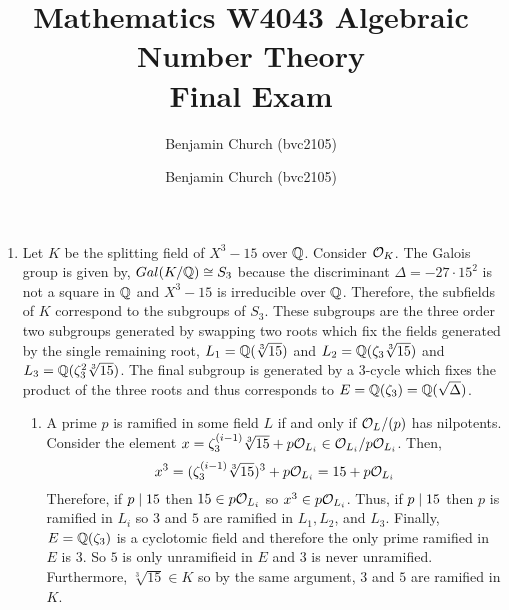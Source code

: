 \documentclass[12pt]{extarticle}
\author{Benjamin Church (bvc2105)}
\newcommand{\ntitle}[1]{\title{%
	\large \textbf{Mathematics W4043 Algebraic Number Theory
	\\ Final Exam} \vspace{-2ex}}
	\author{Benjamin Church (bvc2105)}
\maketitle}
\begin{document}
\ntitle{11}
 
\begin{enumerate}
\item Let $K$ be the splitting field of $X^3 - 15$ over $\mathbb{Q}$. Consider $\mathcal{O}_{K}$. The Galois group is given by, $Gal \small(K/\mathbb{Q} \small) \cong S_3$ because the discriminant $\Delta = -27 \cdot 15^2$ is not a square in $\mathbb{Q}$ and $X^3 - 15$ is irreducible over $\mathbb{Q}$. Therefore, the subfields of $K$ correspond to the subgroups of $S_3$. These subgroups are the three order two subgroups generated by swapping two roots which fix the fields generated by the single remaining root, $L_1 = \mathbb{Q}(\sqrt[3]{15})$ and $L_2 = \mathbb{Q}(\zeta_3 \sqrt[3]{15})$ and $L_3 = \mathbb{Q}(\zeta_3^2 \sqrt[3]{15})$. The final subgroup is generated by a 3-cycle which fixes the product of the three roots and thus corresponds to $E = \mathbb{Q}(\zeta_3) = \mathbb{Q}(\sqrt{\Delta})$. 
\begin{enumerate}
\item A prime $p$ is ramified in some field $L$ if and only if $\mathcal{O}_{L}/(p)$ has nilpotents. Consider the element $x = \zeta_3^{(i-1)} \sqrt[3]{15} + p \mathcal{O}_{L_i} \in \mathcal{O}_{L_i}/p \mathcal{O}_{L_i}$. Then, 
\[x^3 = (\zeta_3^{(i-1)} \sqrt[3]{15})^3 + p \mathcal{O}_{L_i} = 15 + p \mathcal{O}_{L_i}\]
Therefore, if $p \mid 15$ then $15 \in p \mathcal{O}_{L_i}$ so $x^3 \in p \mathcal{O}_{L_i}$. Thus, if $p \mid 15$ then $p$ is ramified in $L_i$ so $3$ and $5$ are ramified in $L_1, L_2$, and $L_3$. Finally, $E = \mathbb{Q}(\zeta_3)$ is a cyclotomic field and therefore the only prime ramified in $E$ is $3$. So $5$ is only unramifieid in $E$ and $3$ is never unramified. Furthermore, $\sqrt[3]{15} \in K$ so by the same argument, $3$ and $5$ are ramified in $K$.  


\end{enumerate}
\end{enumerate}
\end{document}

